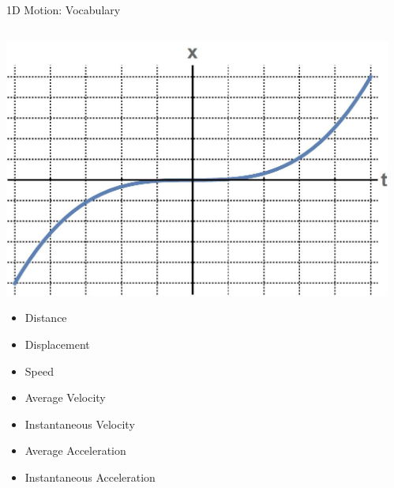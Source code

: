\documentclass{beamer}
\begin{document}
\begin{frame}{1D Motion: Vocabulary}
\begin{columns}
	\begin{column}{0.5\linewidth}
	\includegraphics[width=\linewidth]{graph_3.jpg}
	\vspace{-4mm}
	\begin{itemize}
		\item  Distance
		\item  Displacement
		\item  Speed
		\item  Average Velocity
		\item  Instantaneous Velocity
		\item  Average Acceleration
		\item  Instantaneous Acceleration
	\end{itemize}
	\end{column}
	\begin{column}{0.5\linewidth}
	\end{column}
\end{columns}
\end{frame}
\end{document}
